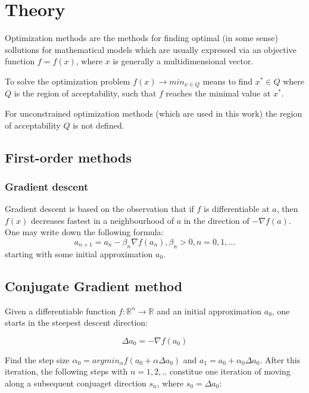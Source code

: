 \section*{Theory}

Optimization methods are the methods for finding optimal (in some sense) sollutions
for mathematical models which are usually expressed via an objective function $f = f(x)$, where $x$ is generally a multidimensional vector.

To solve the optimization problem $f(x) \rightarrow min_{x\in Q}$ means to find $x^{*} \in Q$ where $Q$ is the region of acceptability, such  that $f$ reaches the minimal value at $x^{*}$.

For unconstrained optimization methods (which are used in this work) the region of acceptability $Q$ is not defined.

\subsection*{First-order methods}
\subsubsection*{Gradient descent}
Gradient descent is based on the observation that if $f$
is differentiable at $a$, then $f(x)$ decreases fastest in a neighbourhood of $a$ in the direction of $-\nabla f(a)$. One may write down the following formula:
\begin{equation*}
    a_{n+1} = a_n - \beta_n \nabla f(a_n), \beta_n > 0, n = 0, 1, ...
\end{equation*}
starting with some initial approximation $a_0$.


\subsection*{Conjugate Gradient method}
Given a differentiable function $f: \mathbb{R}^n \rightarrow \mathbb{R}$ and an initial approximation $a_0$, one starts in the steepest descent direction:

\begin{equation*}
    \Delta a_0 = - \nabla f(a_0)
\end{equation*}

Find the step size $\alpha_0 = arg min_{\alpha} f (a_0 + \alpha \Delta a_0)$ and $a_1 = a_0 + \alpha_0 \Delta a_0$. After this iteration, the following steps with
$n = 1, 2, ..$ constitue one iteration of moving along a subsequent conjuaget direction $s_n$, where $s_0 = \Delta a_0$:

